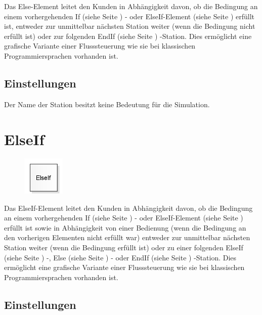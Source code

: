 Das Else-Element leitet den Kunden in Abhängigkeit davon, ob die Bedingung an einem
vorhergehenden If (siehe Seite \pageref{ref:ModelElementLogicIf}) - oder
ElseIf-Element (siehe Seite \pageref{ref:ModelElementLogicElseIf}) erfüllt ist, entweder
zur unmittelbar nächsten Station weiter (wenn die Bedingung nicht erfüllt ist) oder
zur folgenden EndIf (siehe Seite \pageref{ref:ModelElementLogicEndIf}) -Station.
Dies ermöglicht eine grafische Variante einer Flusssteuerung wie sie bei
klassischen Programmiersprachen vorhanden ist.

\subsection*{Einstellungen}

Der Name der Station besitzt keine Bedeutung für die Simulation.


\section{ElseIf}
\label{ref:ModelElementLogicElseIf}

\begin{figure}
\vspace{-22pt}
\includegraphics[width=2cm]{imageModelElementLogicElseIf.png}
\vspace{-22pt}
\end{figure}

Das ElseIf-Element leitet den Kunden in Abhängigkeit davon, ob die Bedingung
an einem vorhergehenden If (siehe Seite \pageref{ref:ModelElementLogicIf}) - oder
ElseIf-Element (siehe Seite \pageref{ref:ModelElementLogicElseIf}) erfüllt ist
sowie in Abhängigkeit von einer Bedienung (wenn die Bedingung an den vorherigen
Elementen nicht erfüllt war) entweder zur unmittelbar nächsten Station weiter
(wenn die Bedingung erfüllt ist) oder zu einer folgenden
ElseIf (siehe Seite \pageref{ref:ModelElementLogicElseIf}) -,
Else (siehe Seite \pageref{ref:ModelElementLogicElse}) - oder
EndIf (siehe Seite \pageref{ref:ModelElementLogicEndIf}) -Station.
Dies ermöglicht eine grafische Variante einer Flusssteuerung wie sie bei
klassischen Programmiersprachen vorhanden ist.

\subsection*{Einstellungen}

